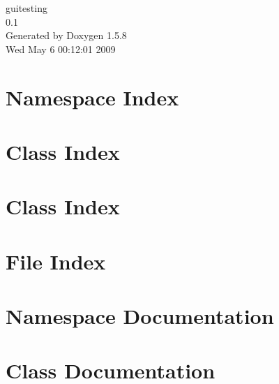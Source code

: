 \documentclass[a4paper]{book}
\begin{document}
\begin{titlepage}
\vspace*{7cm}
\begin{center}
{\Large guitesting \\[1ex]\large 0.1 }\\
\vspace*{1cm}
{\large Generated by Doxygen 1.5.8}\\
\vspace*{0.5cm}
{\small Wed May 6 00:12:01 2009}\\
\end{center}
\end{titlepage}
\clearemptydoublepage
{}
\tableofcontents
\clearemptydoublepage
{}
\chapter{Namespace Index}

\chapter{Class Index}

\chapter{Class Index}

\chapter{File Index}

\chapter{Namespace Documentation}

\chapter{Class Documentation}













































\end{document}
